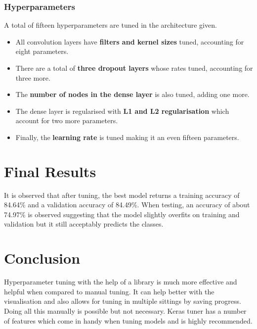 \documentclass[conference, compsoc]{IEEEtran}
\begin{document}
\subsubsection{Hyperparameters}
A total of fifteen hyperparameters are tuned in the architecture given.
\begin{itemize}
    \item All convolution layers have \textbf{filters and kernel sizes} tuned, accounting for eight parameters.
    \item There are a total of \textbf{three dropout layers} whose rates tuned, accounting for three more.
    \item The \textbf{number of nodes in the dense layer} is also tuned, adding one more.
    \item The dense layer is regularised with \textbf{L1 and L2 regularisation} which account for two more parameters.
    \item Finally, the \textbf{learning rate} is tuned making it an even fifteen parameters.
\end{itemize}

\section{Final Results}
It is observed that after tuning, the best model returns a training accuracy of 84.64\% and a validation accuracy of 84.49\%. When testing, an accuracy of about 74.97\% is observed suggesting that the model slightly overfits on training and validation but it still acceptably predicts the classes.

\section{Conclusion}
Hyperparameter tuning with the help of a library is much more effective and helpful when compared to manual tuning. It can help better with the visualisation and also allows for tuning in multiple sittings by saving progress. Doing all this manually is possible but not necessary. Keras tuner has a number of features which come in handy when tuning models and is highly recommended.
\end{document}
